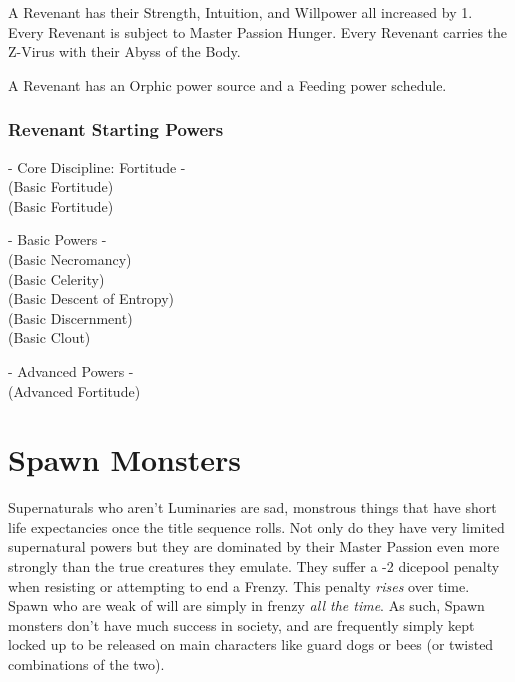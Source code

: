 A Revenant has their Strength, Intuition, and Willpower all increased by 1. Every Revenant is subject to Master Passion Hunger. Every Revenant carries the Z-Virus with their Abyss of the Body.

A Revenant has an Orphic power source and a Feeding power schedule.

\subsubsection{Revenant Starting Powers}

\hspace{\parindent} - Core Discipline: Fortitude -\\
 (Basic Fortitude)\\
 (Basic Fortitude)

- Basic Powers -\\
 (Basic Necromancy)\\
 (Basic Celerity)\\
 (Basic Descent of Entropy)\\
 (Basic Discernment)\\
 (Basic Clout)

- Advanced Powers -\\
 (Advanced Fortitude)

\section{Spawn Monsters} 

Supernaturals who aren't Luminaries are sad, monstrous things that have short life expectancies once the title sequence rolls. Not only do they have very limited supernatural powers but they are dominated by their Master Passion even more strongly than the true creatures they emulate. They suffer a -2 dicepool penalty when resisting or attempting to end a Frenzy. This penalty \textit{rises} over time. Spawn who are weak of will are simply in frenzy \textit{all the time}. As such, Spawn monsters don't have much success in society, and are frequently simply kept locked up to be released on main characters like guard dogs or bees (or twisted combinations of the two).

